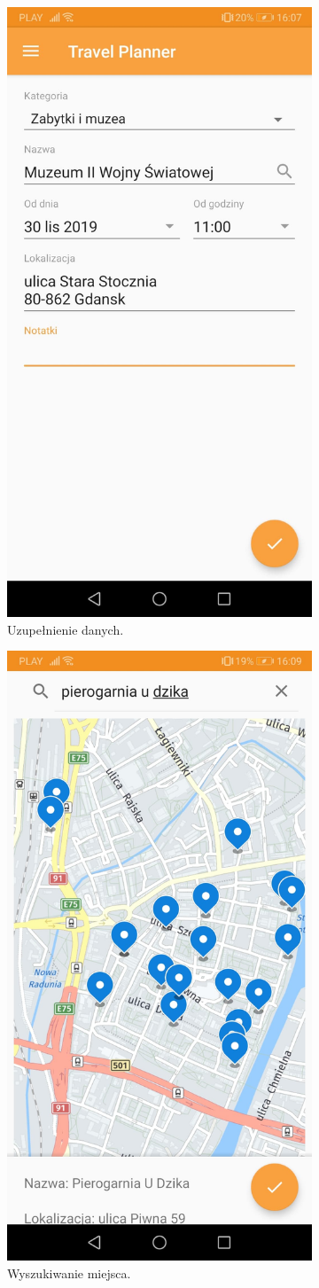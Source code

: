 \documentclass[10pt,twoside,a4paper]{report}
\begin{document}
\begin{figure}[h]
\begin{subfigure}{0.3\textwidth}
\centering
\includegraphics[width=0.9\linewidth, width=5cm]{searchPlace}
\caption{Uzupełnienie danych.}
\label{fig:searchPlace}
\end{subfigure}
\begin{subfigure}{0.3\textwidth}
\centering
\includegraphics[width=0.9\linewidth, width=5cm]{searchingPlace}
\caption{Wyszukiwanie miejsca.}
\label{fig:searchingPlace}
\end{subfigure}
\begin{subfigure}{0.3\textwidth}
\centering

\end{subfigure}
\end{figure}
\end{document}
